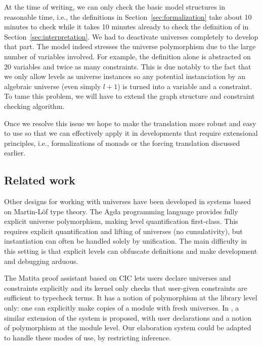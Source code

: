 At the time of writing, we can only check the basic model structures
in reasonable time, i.e., the definitions in
Section~\ref{sec:formalization} take about 10 minutes to check while
it takes 10 minutes already to check the definition of
 in Section~\ref{sec:interpretation}. We had to
  deactivate universes completely to develop that part. The model
  indeed stresses the universe polymorphism due to the large number of
  variables involved. For example, the  definition
  alone is abstracted on 20 variables and twice as many
  constraints. This is due notably to the fact that we only allow
  levels as universe instances so any potential instanciation by an
  algebraic universe (even simply $l + 1$) is turned into a variable
  and a constraint. To tame this problem, we will have to extend the
  graph structure and constraint checking algorithm.

Once we resolve this issue we hope to make the translation more robust
and easy to use so that we can effectively apply it in developments that
require extensional principles, i.e., formalizations of monads or the
forcing translation discussed earlier.

\subsection{Related work}
\label{sec:universe-systems}

Other designs for working with universes have been developed in systems
based on Martin-Löf type theory. The Agda programming language provides
fully explicit universe polymorphism, making level quantification
first-class. This requires explicit quantification and lifting of
universes (no cumulativity), but instantiation can often be handled
solely by unification. The main difficulty in this setting is that
explicit levels can obfuscate definitions and make development and
debugging arduous.

The Matita proof assistant based on CIC lets users declare universes and
constraints explicitly\cite{AspertiCompact} and its kernel only checks
that user-given constraints are sufficient to typecheck terms. It has a
notion of polymorphism at the library level only: one can explicitly
make copies of a module with fresh universes. In
\cite{DBLP:conf/tphol/Courant02}, a similar extension of the \Coq system
is proposed, with user declarations and a notion of polymorphism at the
module level. Our elaboration system could be adapted to handle these
modes of use, by restricting inference.

